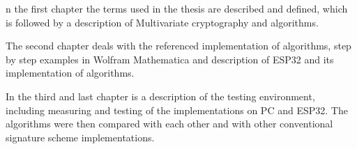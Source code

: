 \documentclass[thesis=M,english]{FITthesis}[2019/12/23]
\begin{document}
\bigskip
\noindent
n the first chapter the terms used in the thesis are described and defined, which is followed by a description of Multivariate cryptography and algorithms.

\bigskip
\noindent
The second chapter deals with the referenced implementation of algorithms, step by step examples in Wolfram Mathematica and description of ESP32 and its implementation of algorithms.

\bigskip
\noindent
In the third and last chapter is a description of the testing environment, including measuring and testing of the implementations on PC and ESP32. The algorithms were then compared with each other and with other conventional signature scheme implementations.



\end{document}
